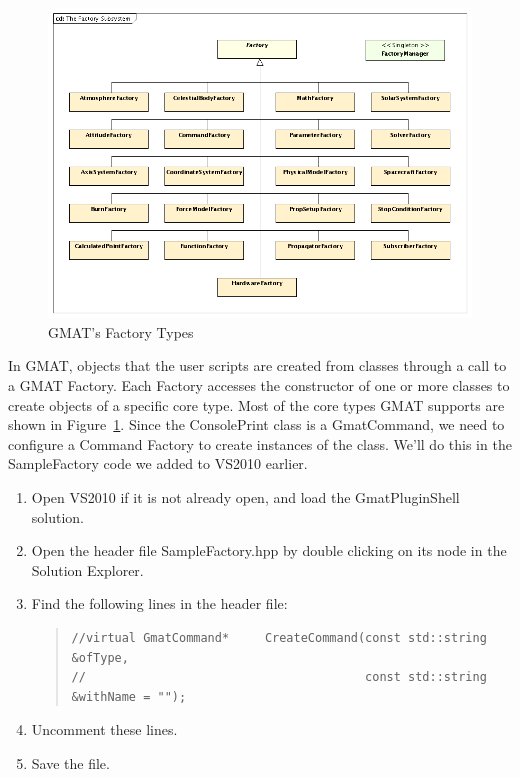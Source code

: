 \documentclass[10pt,letterpaper]{article}
\begin{document}
\begin{figure}[htb]
\begin{center}
\includegraphics[scale=0.5]{images/TheFactorySubsystem.png}
\caption{\label{Factories}GMAT's Factory Types}
\end{center}
\end{figure}

In GMAT, objects that the user scripts are created from classes through a call to a GMAT Factory.  Each Factory accesses the constructor of one or more classes to create objects of a specific core type.  Most of the core types GMAT supports are shown in Figure~\ref{Factories}.  Since the ConsolePrint class is a GmatCommand, we need to configure a Command Factory to create instances of the class.  We'll do this in the SampleFactory code we added to VS2010 earlier.

\begin{enumerate}
\item Open VS2010 if it is not already open, and load the GmatPluginShell solution.
\item Open the header file SampleFactory.hpp by double clicking on its node in the Solution Explorer.
\item Find the following lines in the header file:
\begin{quote}
\begin{verbatim}
//virtual GmatCommand*     CreateCommand(const std::string &ofType,
//                                       const std::string &withName = "");
\end{verbatim}
\end{quote}
\item Uncomment these lines.
\item Save the file.
\setcounter{saveenum}{\value{enumi}}
\end{enumerate}
\end{document}
